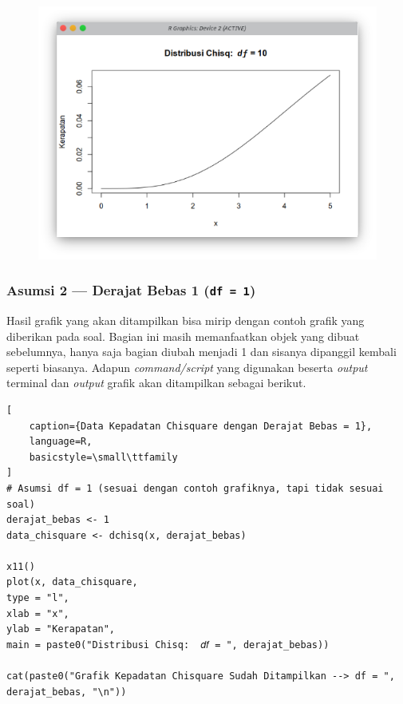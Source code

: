 \begin{figure}[H]
    \centering
    \includegraphics[width=.8\linewidth]{image/Grafik Kepadatan Chisquare Berderajat Bebas 10.png}
    \vspace{-\baselineskip}
\end{figure}

\subsubsection{Asumsi 2 --- Derajat Bebas 1 (\texttt{df = 1})}

Hasil grafik yang akan ditampilkan bisa mirip dengan contoh grafik yang diberikan pada soal. Bagian ini masih memanfaatkan objek yang dibuat sebelumnya, hanya saja bagian  diubah menjadi 1 dan sisanya dipanggil kembali seperti biasanya. Adapun \textit{command/script} yang digunakan beserta \textit{output} terminal dan \textit{output} grafik akan ditampilkan sebagai berikut.

\begin{lstlisting}[
    caption={Data Kepadatan Chisquare dengan Derajat Bebas = 1}, 
    language=R, 
    basicstyle=\small\ttfamily
]
# Asumsi df = 1 (sesuai dengan contoh grafiknya, tapi tidak sesuai soal)
derajat_bebas <- 1
data_chisquare <- dchisq(x, derajat_bebas)

x11()
plot(x, data_chisquare,
type = "l",
xlab = "x",
ylab = "Kerapatan",
main = paste0("Distribusi Chisq:  𝑑𝑓 = ", derajat_bebas))

cat(paste0("Grafik Kepadatan Chisquare Sudah Ditampilkan --> df = ", derajat_bebas, "\n"))
\end{lstlisting}

